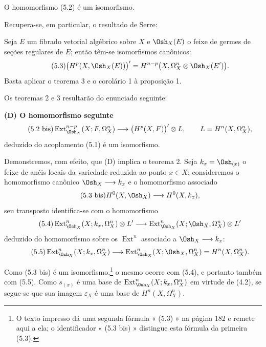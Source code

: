  O homomorfismo (5.2) é um isomorfismo.

Recupera-se, em particular, o resultado de Serre:

 Seja $E$ um fibrado vetorial algébrico sobre $X$ e
$\Osh_X(E)$ o feixe de germes de seções regulares de $E$; então têm-se
isomorfismos canônicos:
\begin{equation}\tag{5.3}
  \bigl(H^{p}(X,\Osh_X(E))\bigr)'
  =H^{n-p}\bigl(X,\Omega_X^{n}\otimes\Osh_X(E')\bigr).
\end{equation}
Basta aplicar o teorema 3 e o corolário 1 à proposição 1.

Os teoremas 2 e 3 resultarão do enunciado seguinte:

\noindent\textbf{(D) O homomorfismo seguinte}
\begin{equation}\tag{5.2 bis}
  \operatorname{Ext}_{\Osh_X}^{n-p}(X;F,\Omega_X^{n})
  \longrightarrow\bigl(H^{p}(X,F)\bigr)'\otimes L,
  \qquad L=H^{n}(X,\Omega_X^{n}),
\end{equation}
deduzido do acoplamento (5.1) é um isomorfismo.

Demonstremos, com efeito, que (D) implica o teorema 2. Seja
$k_x=\Osh_{(x)}$ o feixe de anéis locais da variedade reduzida ao ponto
$x\in X$; consideremos o homomorfismo canônico
$\Osh_X\longrightarrow k_x$ e o homomorfismo associado
\begin{equation}\tag{5.3 bis}
  H^{0}(X,\Osh_X)\longrightarrow H^{0}(X,k_x),
\end{equation}
seu transposto identifica-se com o homomorfismo
\begin{equation}\tag{5.4}
  \operatorname{Ext}_{\Osh_X}^{n}(X;k_x,\Omega_X^{n})\otimes L'
  \longrightarrow
  \operatorname{Ext}_{\Osh_X}^{n}(X;\Osh_X,\Omega_X^{n})\otimes L'
\end{equation}
deduzido do homomorfismo sobre os $\operatorname{Ext}^{n}$ associado a
$\Osh_X\longrightarrow k_x$:
\begin{equation}\tag{5.5}
  \operatorname{Ext}_{\Osh_X}^{n}(X;k_x,\Omega_X^{n})
  \longrightarrow
  \operatorname{Ext}_{\Osh_X}^{n}(X;\Osh_X,\Omega_X^{n})
  =H^{n}(X,\Omega_X^{n}).
\end{equation}

Como (5.3 bis) é um isomorfismo,\footnote{O texto impresso dá uma
segunda fórmula « (5.3) » na página 182 e remete aqui a ela; o identificador
« (5.3 bis) » distingue esta fórmula da primeira (5.3).} o mesmo ocorre
com (5.4), e portanto também com (5.5). Como $s_{(x)}$ é uma base de
$\operatorname{Ext}_{\Osh_X}^{n}(X;k_x,\Omega_X^{n})$ em virtude de (4.2), se
segue-se que sua imagem $\varepsilon_X$ é uma base de
$H^{n}(X,\Omega_X^{n})$.

